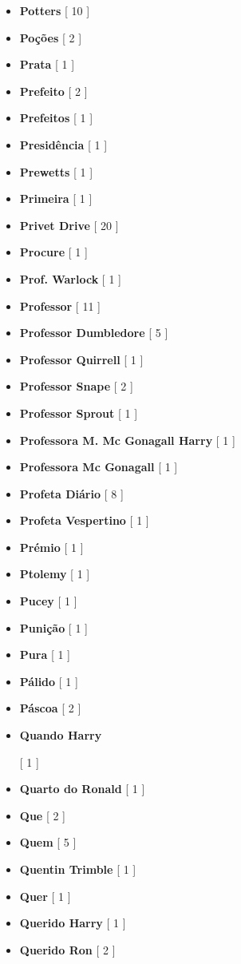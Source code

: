 \documentclass[a4paper]{article}
\begin{document}
{\begin{itemize}
	\item \textbf{Potters} [ 10 ]
	\item \textbf{Poções} [ 2 ]
	\item \textbf{Prata} [ 1 ]
	\item \textbf{Prefeito} [ 2 ]
	\item \textbf{Prefeitos} [ 1 ]
	\item \textbf{Presidência} [ 1 ]
	\item \textbf{Prewetts} [ 1 ]
	\item \textbf{Primeira} [ 1 ]
	\item \textbf{Privet Drive} [ 20 ]
	\item \textbf{Procure} [ 1 ]
	\item \textbf{Prof. Warlock} [ 1 ]
	\item \textbf{Professor} [ 11 ]
	\item \textbf{Professor Dumbledore} [ 5 ]
	\item \textbf{Professor Quirrell} [ 1 ]
	\item \textbf{Professor Snape} [ 2 ]
	\item \textbf{Professor Sprout} [ 1 ]
	\item \textbf{Professora M. Mc Gonagall Harry} [ 1 ]
	\item \textbf{Professora Mc Gonagall} [ 1 ]
	\item \textbf{Profeta Diário} [ 8 ]
	\item \textbf{Profeta Vespertino} [ 1 ]
	\item \textbf{Prémio} [ 1 ]
	\item \textbf{Ptolemy} [ 1 ]
	\item \textbf{Pucey} [ 1 ]
	\item \textbf{Punição} [ 1 ]
	\item \textbf{Pura} [ 1 ]
	\item \textbf{Pálido} [ 1 ]
	\item \textbf{Páscoa} [ 2 ]
	\item \hypertarget{Q}{\textbf{Quando Harry}} [ 1 ]
	\item \textbf{Quarto do Ronald} [ 1 ]
	\item \textbf{Que} [ 2 ]
	\item \textbf{Quem} [ 5 ]
	\item \textbf{Quentin Trimble} [ 1 ]
	\item \textbf{Quer} [ 1 ]
	\item \textbf{Querido Harry} [ 1 ]
	\item \textbf{Querido Ron} [ 2 ]

\end{itemize}}
\end{document}
